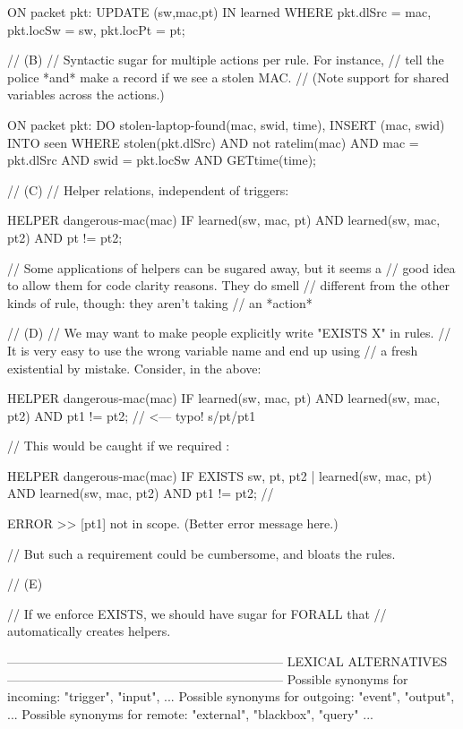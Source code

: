 ON packet pkt:
  UPDATE (sw,mac,pt) IN learned WHERE
    pkt.dlSrc = mac,
    pkt.locSw = sw,
    pkt.locPt = pt;

// (B)
// Syntactic sugar for multiple actions per rule. For instance, 
// tell the police *and* make a record if we see a stolen MAC.
// (Note support for shared variables across the actions.)

ON packet pkt:
  DO stolen-laptop-found(mac, swid, time),
  INSERT (mac, swid) INTO seen WHERE  
    stolen(pkt.dlSrc) AND
    not ratelim(mac) AND    
    mac = pkt.dlSrc AND 
    swid = pkt.locSw AND
    GETtime(time);

// (C)
// Helper relations, independent of triggers:

HELPER dangerous-mac(mac) IF
  learned(sw, mac, pt) AND
  learned(sw, mac, pt2) AND
  pt != pt2;

// Some applications of helpers can be sugared away, but it seems a
// good idea to allow them for code clarity reasons. They do smell
// different from the other kinds of rule, though: they aren't taking
// an *action* 

// (D)
// We may want to make people explicitly write "EXISTS X" in rules.
// It is very easy to use the wrong variable name and end up using
// a fresh existential by mistake. Consider, in the above:

HELPER dangerous-mac(mac) IF
  learned(sw, mac, pt) AND
  learned(sw, mac, pt2) AND
  pt1 != pt2;  // <--- typo! s/pt/pt1

// This would be caught if we required :

HELPER dangerous-mac(mac) IF
  EXISTS sw, pt, pt2 |
    learned(sw, mac, pt) AND
    learned(sw, mac, pt2) AND
    pt1 != pt2;  // 

ERROR >> [pt1] not in scope. (Better error message here.)

// But such a requirement could be cumbersome, and bloats the rules.

// (E)

// If we enforce EXISTS, we should have sugar for FORALL that
// automatically creates helpers.
















------------------------------------------------------------------
LEXICAL ALTERNATIVES
------------------------------------------------------------------
Possible synonyms for incoming: "trigger", "input", ...
Possible synonyms for outgoing: "event", "output", ...
Possible synonyms for remote: "external", "blackbox", "query" ...

